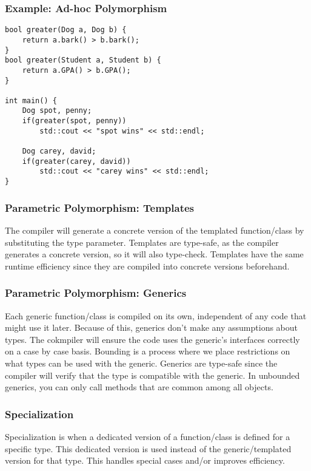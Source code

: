 \documentclass{article}
\begin{document}
\subsubsection*{Example: Ad-hoc Polymorphism}
\begin{verbatim}
bool greater(Dog a, Dog b) {
    return a.bark() > b.bark();
}
bool greater(Student a, Student b) {
    return a.GPA() > b.GPA();
}

int main() {
    Dog spot, penny;
    if(greater(spot, penny))
        std::cout << "spot wins" << std::endl;

    Dog carey, david;
    if(greater(carey, david))
        std::cout << "carey wins" << std::endl;
}
\end{verbatim}

\subsubsection{Parametric Polymorphism: Templates}
The compiler will generate a concrete version of the templated
function/class by substituting the type parameter. Templates are
type-safe, as the compiler generates a concrete version, so it will
also type-check. Templates have the same runtime efficiency since they
are compiled into concrete versions beforehand.

\subsubsection{Parametric Polymorphism: Generics}
Each generic function/class is compiled on its own, independent of any
code that might use it later. Because of this, generics don't make any
assumptions about types. The cokmpiler will ensure the code uses the
generic's interfaces correctly on a case by case basis. Bounding is a
process where we place restrictions on what types can be used with the
generic. Generics are type-safe since the compiler will verify that
the type is compatible with the generic. In unbounded generics, you
can only call methods that are common among all objects.

\subsubsection{Specialization}
Specialization is when a dedicated version of a function/class is
defined for a specific type. This dedicated version is used instead of
the generic/templated version for that type. This handles special
cases and/or improves efficiency.
\end{document}
